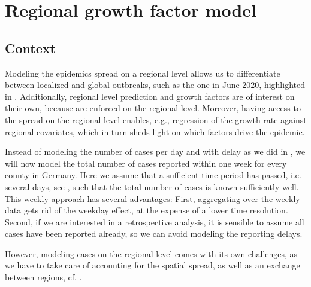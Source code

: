 \section{Regional growth factor model}%
\label{sec:regional_growth_factor_model}

\subsection{Context}

Modeling the epidemics spread on a regional level allows us to differentiate between localized and global outbreaks, such as the one in June 2020, highlighted in . Additionally, regional level prediction and growth factors are of interest on their own, because  are enforced on the regional level. Moreover, having access to the spread on the regional level enables, e.g., regression of the growth rate against regional covariates, which in turn sheds light on which factors drive the epidemic.

Instead of modeling the number of cases per day and with delay as we did in , we will now model the total number of cases reported within one week for every county in Germany. Here we assume that a sufficient time period has passed, i.e. several days, see , such that the total number of cases is known sufficiently well. This weekly approach has several advantages: First, aggregating over the weekly data gets rid of the weekday effect, at the expense of a lower time resolution. Second, if we are interested in a retrospective analysis, it is sensible to assume all cases have been reported already, so we can avoid modeling the reporting delays. 

However, modeling cases on the regional level comes with its own challenges, as we have to take care of accounting for the spatial spread, as well as an exchange between regions, cf. . 




